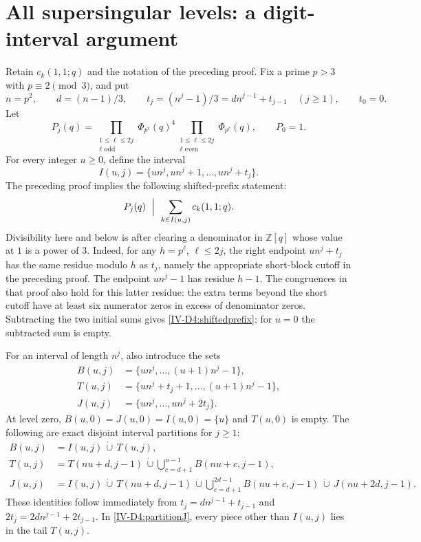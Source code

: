 \documentclass[11pt,letterpaper]{article}
\numberwithin{equation}{section}
\begin{document}
\section{All supersingular levels: a digit-interval argument}\label{loc-IV-3}
\label{IV-sec:D-all}
Retain $c_k(1,1;q)$ and the notation of the preceding proof.  Fix a
prime $p>3$ with $p\equiv2\pmod3$, and put
\[
 n=p^2,\qquad d=(n-1)/3,\qquad t_j=(n^j-1)/3
       =d n^{j-1}+t_{j-1}\quad(j\ge1),\qquad t_0=0.
\]
Let
\[
 P_j(q)=\prod_{\substack{1\le\ell\le2j\\\ell\text{ odd}}}
                 \Phi_{p^\ell}(q)^4
          \prod_{\substack{1\le\ell\le2j\\\ell\text{ even}}}
                 \Phi_{p^\ell}(q),\qquad P_0=1.
\]
For every integer $u\ge0$, define the interval
\[
 I(u,j)=\{un^j,un^j+1,\ldots,un^j+t_j\}.
\]
The preceding proof implies the following shifted-prefix statement:
\begin{equation}\label{IV-D4:shiftedprefix}
 P_j(q)\ \Bigm|\ \sum_{k\in I(u,j)}c_k(1,1;q).
\end{equation}
Divisibility here and below is after clearing a denominator in
$\mathbb Z[q]$ whose value at $1$ is a power of $3$.
Indeed, for any $h=p^\ell$, $\ell\le2j$, the right endpoint
$un^j+t_j$ has the same residue modulo $h$ as $t_j$, namely the
appropriate short-block cutoff in the preceding proof.  The endpoint
$un^j-1$ has residue $h-1$.  The congruences in that proof also
hold for this latter residue: the extra terms beyond the short
cutoff have at least six numerator zeros in excess of denominator
zeros.  Subtracting the two initial sums gives
\eqref{IV-D4:shiftedprefix}; for $u=0$ the subtracted sum is empty.

For an interval of length $n^j$, also introduce the sets
\[
 \begin{split}
 B(u,j)&=\{un^j,\ldots,(u+1)n^j-1\},\\
 T(u,j)&=\{un^j+t_j+1,\ldots,(u+1)n^j-1\},\\
 J(u,j)&=\{un^j,\ldots,un^j+2t_j\}.
 \end{split}
\]
At level zero, $B(u,0)=J(u,0)=I(u,0)=\{u\}$ and $T(u,0)$
is empty.  The following are exact disjoint interval partitions
for $j\ge1$:
\begin{align}
 B(u,j)&=I(u,j)\,\dot\cup\,T(u,j),\label{IV-D4:partitionB}\\
 T(u,j)&=T(nu+d,j-1)
       \,\dot\cup\!\!\!\bigcup_{c=d+1}^{n-1}B(nu+c,j-1),
                                                    \label{IV-D4:partitionT}\\
 J(u,j)&=I(u,j)\,\dot\cup\,T(nu+d,j-1)
       \,\dot\cup\!\!\!\bigcup_{c=d+1}^{2d-1}B(nu+c,j-1)
       \,\dot\cup\,J(nu+2d,j-1).\label{IV-D4:partitionJ}
\end{align}
These identities follow immediately from
$t_j=dn^{j-1}+t_{j-1}$ and $2t_j=2dn^{j-1}+2t_{j-1}$.
In \eqref{IV-D4:partitionJ}, every piece other than $I(u,j)$
lies in the tail $T(u,j)$.
\end{document}
